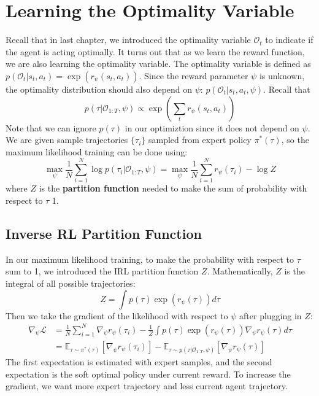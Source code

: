 \section{Learning the Optimality Variable}
Recall that in last chapter, we introduced the optimality variable $\mathcal{O}_t$ to indicate if the agent is acting optimally. It turns out that as we learn the reward function, we are also learning the optimality variable. The optimality variable is defined as $p(\mathcal{O}_t|s_t,a_t) = \exp(r_\psi(s_t,a_t))$. Since the reward parameter $\psi$ is unknown, the optimality distribution should also depend on $\psi$: $p(\mathcal{O}_t|s_t,a_t,\psi)$. Recall that \[p(\tau|\mathcal{O}_{1:T},\psi)\propto\exp \left(\sum_tr_\psi(s_t,a_t)\right)\] Note that we can ignore $p(\tau)$ in our optimiztion since it does not depend on $\psi$. We are given sample trajectories $\{\tau_i\}$ sampled from expert policy $\pi^*(\tau)$, so the maximum likelihood training can be done using:
\[
\max_\psi\frac{1}{N}\sum_{i=1}^N\log p(\tau_i|\mathcal{O}_{1:T},\psi) = \max_\psi\frac{1}{N}\sum_{i=1}^N r_\psi(\tau_i)-\log Z
\]
where $Z$ is the \textbf{partition function} needed to make the sum of probability with respect to $\tau$ 1.

\subsection{Inverse RL Partition Function}
In our maximum likelihood training, to make the probability with respect to $\tau$ sum to 1, we introduced the IRL partition function $Z$. Mathematically, $Z$ is the integral of all possible trajectories:
\[
Z = \int p(\tau)\exp(r_\psi(\tau))d\tau
\]
Then we take the gradient of the likelihood with respect to $\psi$ after plugging in $Z$:
\begin{align*}
\nabla_\psi \mathcal{L} &= \frac{1}{N}\sum_{i=1}^N\nabla_\psi r_\psi(\tau_i) - \frac{1}{Z}\int p(\tau)\exp(r_\psi(\tau))\nabla_\psi r_\psi(\tau)d\tau\\
&= \mathbb{E}_{\tau\sim\pi^*(\tau)}[\nabla_\psi r_\psi(\tau_i)] - \mathbb{E}_{\tau\sim p(\tau|\mathcal{O}_{1:T},\psi)}[\nabla_\psi r_\psi(\tau)]
\end{align*}
The first expectation is estimated with expert samples, and the second expectation is the soft optimal policy under current reward. To increase the gradient, we want more expert trajectory and less current agent trajectory.

